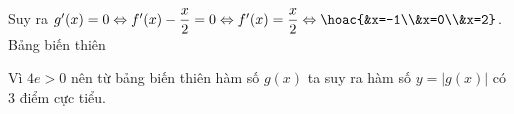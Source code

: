 \begin{ex}
{\begin{center}
        \end{center}
        Suy ra $g'(x)=0\Leftrightarrow f'(x)-\dfrac{x}{2}=0\Leftrightarrow f'(x)=\dfrac{x}{2}\Leftrightarrow \hoac{&x=-1\\&x=0\\&x=2}$.\\
        Bảng biến thiên
        \begin{center}
        \end{center}
        Vì $4e>0$ nên từ bảng biến thiên hàm số $g(x)$ ta suy ra hàm số $y=\left|g(x)\right|$ có $3$ điểm cực tiểu.
    }
\end{ex}

